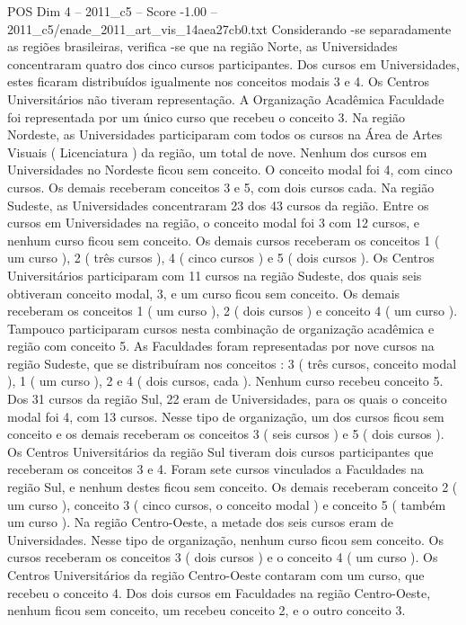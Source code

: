 \begin{textsample}{POS Dim 4 – 2011\_c5 – Score -1.00 – 2011\_c5/enade\_2011\_art\_vis\_14aea27cb0.txt}
Considerando -se separadamente as regiões brasileiras, verifica -se que na região Norte, as Universidades concentraram quatro dos cinco cursos participantes.
Dos cursos em Universidades, estes ficaram distribuídos igualmente nos conceitos modais 3 e 4.
Os Centros Universitários não tiveram representação.
A Organização Acadêmica Faculdade foi representada por um único curso que recebeu o conceito 3.
Na região Nordeste, as Universidades participaram com todos os cursos na Área de Artes Visuais ( Licenciatura ) da região, um total de nove.
Nenhum dos cursos em Universidades no Nordeste ficou sem conceito.
O conceito modal foi 4, com cinco cursos.
Os demais receberam conceitos 3 e 5, com dois cursos cada.
Na região Sudeste, as Universidades concentraram 23 dos 43 cursos da região.
Entre os cursos em Universidades na região, o conceito modal foi 3 com 12 cursos, e nenhum curso ficou sem conceito.
Os demais cursos receberam os conceitos 1 ( um curso ), 2 ( três cursos ), 4 ( cinco cursos ) e 5 ( dois cursos ).
Os Centros Universitários participaram com 11 cursos na região Sudeste, dos quais seis obtiveram conceito modal, 3, e um curso ficou sem conceito.
Os demais receberam os conceitos 1 ( um curso ), 2 ( dois cursos ) e conceito 4 ( um curso ).
Tampouco participaram cursos nesta combinação de organização acadêmica e região com conceito 5.
As Faculdades foram representadas por nove cursos na região Sudeste, que se distribuíram nos conceitos : 3 ( três cursos, conceito modal ), 1 ( um curso ), 2 e 4 ( dois cursos, cada ).
Nenhum curso recebeu conceito 5.
Dos 31 cursos da região Sul, 22 eram de Universidades, para os quais o conceito modal foi 4, com 13 cursos.
Nesse tipo de organização, um dos cursos ficou sem conceito e os demais receberam os conceitos 3 ( seis cursos ) e 5 ( dois cursos ).
Os Centros Universitários da região Sul tiveram dois cursos participantes que receberam os conceitos 3 e 4.
Foram sete cursos vinculados a Faculdades na região Sul, e nenhum destes ficou sem conceito.
Os demais receberam conceito 2 ( um curso ), conceito 3 ( cinco cursos, o conceito modal ) e conceito 5 ( também um curso ).
Na região Centro-Oeste, a metade dos seis cursos eram de Universidades.
Nesse tipo de organização, nenhum curso ficou sem conceito.
Os cursos receberam os conceitos 3 ( dois cursos ) e o conceito 4 ( um curso ).
Os Centros Universitários da região Centro-Oeste contaram com um curso, que recebeu o conceito 4.
Dos dois cursos em Faculdades na região Centro-Oeste, nenhum ficou sem conceito, um recebeu conceito 2, e o outro conceito 3.

\end{textsample}
